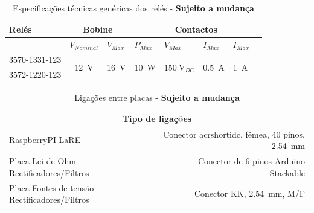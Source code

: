\documentclass[a4paper,oneside,final,twocolumn]{article}
\begin{document}
\begin{table}[htb]
\caption{Especificações técnicas genéricas dos relés - \textbf{Sujeito a mudança}}
\centering
\begin{tabular}{lcclllll}
\toprule
Relés & \multicolumn{2}{c}{Bobine} & \multicolumn{5}{c}{Contactos}\\
\midrule
& \multicolumn{1}{l}{$V_{Nominal}$} & \multicolumn{1}{l}{$V_{Max}$} & $P_{Max}$ & $V_{Max}$ & $I_{Max}$ & $I_{Max}$\\
\midrule
3570-1331-123  & \multirow{2}{*}{\SI{12}{\volt}} & \multirow{2}{*}{\SI{16}{\volt}}  & \multirow{2}{*}{\SI{10}{\watt}} & \multirow{2}{*}{$\SI{150}{\volt}_{DC}$} & \multirow{2}{*}{\SI{0.5}{\ampere}} & \multirow{2}{*}{\SI{1}{\ampere}}\\
3572-1220-123 & & & & & & &\\                
\bottomrule
\end{tabular}%
\end{table}

\begin{table}[htb]
\caption{Ligações entre placas - \textbf{Sujeito a mudança}}
\label{Table:ligacoesplacas}
\centering
\begin{tabular}{lr}
\toprule
\multicolumn{2}{c}{Tipo de ligações}\\
\midrule
RaspberryPI-LaRE & Conector acrshort{idc}, fêmea, 40 pinos, \SI{2.54}{\mm}\\
Placa Lei de Ohm-Rectificadores/Filtros & Conector de 6 pinos Arduino Stackable\\
Placa Fontes de tensão-Rectificadores/Filtros &  Conector KK, \SI{2.54}{\mm}, M/F \\
\bottomrule
\end{tabular}
\end{table}
\raggedright

\newpage

\tableofcontents
\listoftables

\newpage
\end{document}
